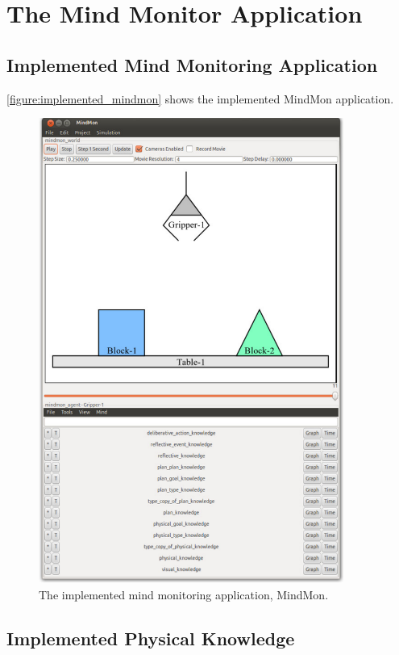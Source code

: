 \chapter{The Mind Monitor Application}
\label{chapter:the_mind_monitor_application}

\section{Implemented Mind Monitoring Application}

{\mbox{\autoref{figure:implemented_mindmon}}} shows the implemented
MindMon application.
\begin{figure}
\includegraphics[width=10cm]{gfx/implemented_mindmon}
\caption[The implemented mind monitoring application, MindMon.]{The
  implemented mind monitoring application, MindMon.}
\label{figure:implemented_mindmon}
\end{figure}

\section{Implemented Physical Knowledge}

